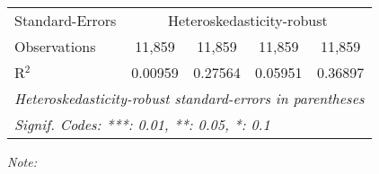 \begin{table}[htbp!]
\begin{adjustbox}{width = 1\textwidth, max height = 0.95\textheight, center}
\begin{threeparttable}[b]
\begin{tabular}{lcccc}
            \midrule 
            Standard-Errors & \multicolumn{4}{c}{Heteroskedasticity-robust} \\ 
            Observations         & 11,859                         & 11,859                         & 11,859                         & 11,859\\  
            R$^2$                & 0.00959                        & 0.27564                        & 0.05951                        & 0.36897\\  
            \midrule \midrule
            \multicolumn{5}{l}{\emph{Heteroskedasticity-robust standard-errors in parentheses}}\\
            \multicolumn{5}{l}{\emph{Signif. Codes: ***: 0.01, **: 0.05, *: 0.1}}\\
         \end{tabular}
         
         \begin{tablenotes}\item \medskip \textit{Note:}
         \end{tablenotes}
      \end{threeparttable}
   \end{adjustbox}
\end{table}


